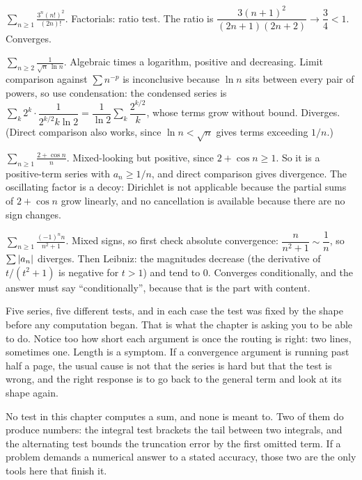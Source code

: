 $\displaystyle\sum_{n\geq1}\frac{3^{n}(n!)^{2}}{(2n)!}$. Factorials: ratio test. The ratio is $\dfrac{3(n+1)^2}{(2n+1)(2n+2)}\to\dfrac34<1$. Converges.

$\displaystyle\sum_{n\geq2}\frac{1}{\sqrt{n}\,\ln n}$. Algebraic times a logarithm, positive and decreasing. Limit comparison against $\sum n^{-p}$ is inconclusive because $\ln n$ sits between every pair of powers, so use condensation: the condensed series is $\sum_k2^k\cdot\dfrac{1}{2^{k/2}k\ln2}=\dfrac{1}{\ln2}\sum_k\dfrac{2^{k/2}}{k}$, whose terms grow without bound. Diverges. (Direct comparison also works, since $\ln n<\sqrt n$ gives terms exceeding $1/n$.)

$\displaystyle\sum_{n\geq1}\frac{2+\cos n}{n}$. Mixed-looking but positive, since $2+\cos n\geq1$. So it is a positive-term series with $a_n\geq1/n$, and direct comparison gives divergence. The oscillating factor is a decoy: Dirichlet is not applicable because the partial sums of $2+\cos n$ grow linearly, and no cancellation is available because there are no sign changes.

$\displaystyle\sum_{n\geq1}\frac{(-1)^{n}n}{n^{2}+1}$. Mixed signs, so first check absolute convergence: $\dfrac{n}{n^2+1}\sim\dfrac1n$, so $\sum\left\lvert a_n\right\rvert$ diverges. Then Leibniz: the magnitudes decrease (the derivative of $t/(t^2+1)$ is negative for $t>1$) and tend to $0$. Converges conditionally, and the answer must say ``conditionally'', because that is the part with content.

Five series, five different tests, and in each case the test was fixed by the shape before any computation began. That is what the chapter is asking you to be able to do. Notice too how short each argument is once the routing is right: two lines, sometimes one. Length is a symptom. If a convergence argument is running past half a page, the usual cause is not that the series is hard but that the test is wrong, and the right response is to go back to the general term and look at its shape again.

\begin{keynote}
No test in this chapter computes a sum, and none is meant to. Two of them do produce numbers: the integral test brackets the tail between two integrals, and the alternating test bounds the truncation error by the first omitted term. If a problem demands a numerical answer to a stated accuracy, those two are the only tools here that finish it.
\end{keynote}

